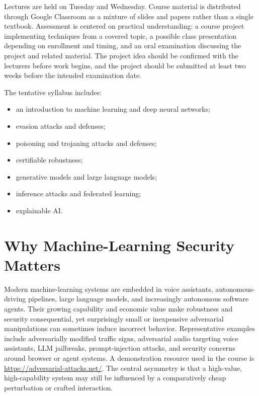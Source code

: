 \documentclass[11pt,a4paper]{report}
\begin{document}
\begin{remarkbox}[title={Course logistics and assessment}]
Lectures are held on Tuesday and Wednesday. Course material is distributed through Google Classroom as a mixture of slides and papers rather than a single textbook. Assessment is centered on practical understanding: a course project implementing techniques from a covered topic, a possible class presentation depending on enrollment and timing, and an oral examination discussing the project and related material. The project idea should be confirmed with the lecturers before work begins, and the project should be submitted at least two weeks before the intended examination date.
\end{remarkbox}

The tentative syllabus includes:
\begin{itemize}
  \item an introduction to machine learning and deep neural networks;
  \item evasion attacks and defenses;
  \item poisoning and trojaning attacks and defenses;
  \item certifiable robustness;
  \item generative models and large language models;
  \item inference attacks and federated learning;
  \item explainable AI.
\end{itemize}

\section{Why Machine-Learning Security Matters}

Modern machine-learning systems are embedded in voice assistants, autonomous-driving pipelines, large language models, and increasingly autonomous software agents. Their growing capability and economic value make robustness and security consequential, yet surprisingly small or inexpensive adversarial manipulations can sometimes induce incorrect behavior. Representative examples include adversarially modified traffic signs, adversarial audio targeting voice assistants, LLM jailbreaks, prompt-injection attacks, and security concerns around browser or agent systems. A demonstration resource used in the course is \url{https://adversarial-attacks.net/}. The central asymmetry is that a high-value, high-capability system may still be influenced by a comparatively cheap perturbation or crafted interaction.
\end{document}
